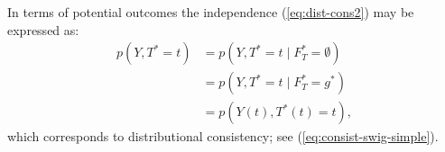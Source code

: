 \documentclass[11pt]{article}
\begin{document}
{In terms of potential outcomes the independence (\ref{eq:dist-cons2}) may be expressed as:
 \begin{align}
p(Y, T^*=t) &= p(Y, T^*=t \mid F^*_T=\emptyset)\nonumber\\
&= p(Y, T^*=t \mid F^*_T=g^*)\nonumber\\
&= p(Y(t), T^*(t)=t),\label{eq:dist-cons3}
\end{align}
which corresponds to distributional consistency; see (\ref{eq:consist-swig-simple}).





}
\end{document}
